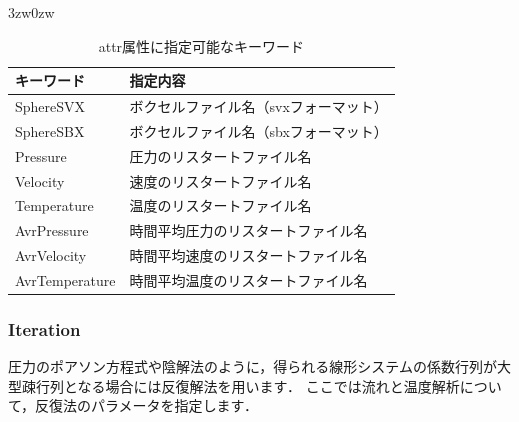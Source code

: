\begin{indentation}{3zw}{0zw}
\begin{table}[htdp]
\caption{attr属性に指定可能なキーワード}
\begin{center}
\small
\begin{tabular}{ll} \toprule
キーワード & 指定内容\\ \midrule
SphereSVX & ボクセルファイル名（svxフォーマット）\\
SphereSBX & ボクセルファイル名（sbxフォーマット）\\
Pressure & 圧力のリスタートファイル名\\
Velocity & 速度のリスタートファイル名\\
Temperature & 温度のリスタートファイル名\\
AvrPressure & 時間平均圧力のリスタートファイル名\\
AvrVelocity & 時間平均速度のリスタートファイル名\\
AvrTemperature & 時間平均温度のリスタートファイル名\\ \bottomrule
\end{tabular}
\end{center}
\label{tbl:infile_attr}
\end{table}

\end{indentation}



\pagebreak
\subsubsection{Iteration}

圧力のポアソン方程式や陰解法のように，得られる線形システムの係数行列が大型疎行列となる場合には反復解法を用います．
ここでは流れと温度解析について，\hypertarget{tgt:iteration}{反復法のパラメータを指定}します．

